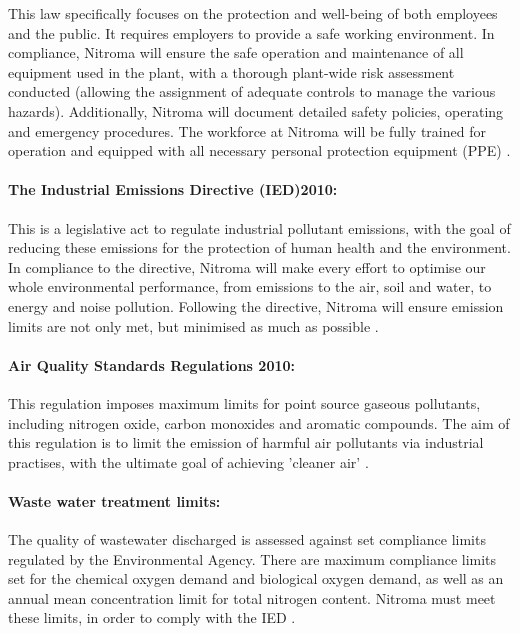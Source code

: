 This law specifically focuses on the protection and well-being of both employees and the public. It requires employers to provide a safe working environment. In compliance, Nitroma will ensure the safe operation and maintenance of all equipment used in the plant, with a thorough plant-wide risk assessment conducted (allowing the assignment of adequate controls to manage the various hazards). Additionally, Nitroma will document detailed safety policies, operating and emergency procedures. The workforce at Nitroma will be fully trained for operation and equipped with all necessary personal protection equipment (PPE) \cite{british_safety_council_health_nodate}.

\paragraph{The Industrial Emissions Directive (IED)2010:}

This is a legislative act to regulate industrial pollutant emissions, with the goal of reducing these emissions for the protection of human health and the environment. In compliance to the directive, Nitroma will make every effort to optimise our whole environmental performance, from emissions to the air, soil and water, to energy and noise pollution. Following the directive, Nitroma will ensure emission limits are not only met, but minimised as much as possible \cite{european_commission_industrial_nodate}. 

\paragraph{Air Quality Standards Regulations 2010:}

This regulation imposes maximum limits for point source gaseous pollutants, including nitrogen oxide, carbon monoxides and aromatic compounds. The aim of this regulation is to limit the emission of harmful air pollutants via industrial practises, with the ultimate goal of achieving 'cleaner air' \cite{tilling_meeting_2017}.  

\paragraph{Waste water treatment limits:}

The quality of wastewater discharged is assessed against set compliance limits regulated by the Environmental Agency. There are maximum compliance limits set for the chemical oxygen demand and biological oxygen demand, as well as an annual mean concentration limit for total nitrogen content. Nitroma must meet these limits, in order to comply with the IED \cite{environment_agency_waste_nodate}. 

